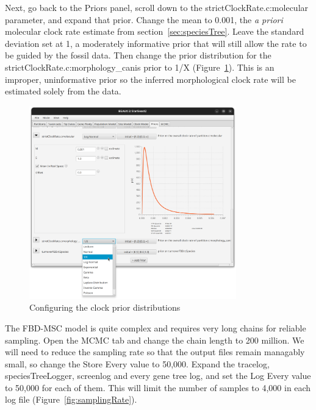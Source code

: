 \documentclass[12pt]{article}
\begin{document}
Next, go back to the Priors panel, scroll down to the strictClockRate.c:molecular
parameter, and expand that prior. Change the mean to 0.001, the \textit{a
priori} molecular clock rate estimate from section~\ref{sec:speciesTree}.
Leave the standard deviation set at 1, a moderately informative prior that
will still allow the rate to be guided by the fossil data. Then change the
prior distribution for the strictClockRate.c:morphology\_canis prior to 1/X
(Figure~\ref{fig:clockPriors}). This is an improper, uninformative prior so
the inferred morphological clock rate will be estimated solely from the data.

\begin{figure}[htb!]
\centering
\includegraphics[width=0.8\textwidth]{figures/clockPriors.png}
\caption
{Configuring the clock prior distributions}
\label{fig:clockPriors}
\end{figure}

\clearpage

The FBD-MSC model is quite complex and requires very long chains for
reliable sampling. Open the MCMC tab and change the chain length to 200
million. We will need to reduce the sampling rate so that the output files remain
managably small, so change the Store Every value to 50,000. Expand the
tracelog, speciesTreeLogger, screenlog and every gene tree log, and set the
Log Every value to 50,000 for each of them. This will limit the number of
samples to 4,000 in each log file (Figure~\ref{fig:samplingRate}).
\end{document}
